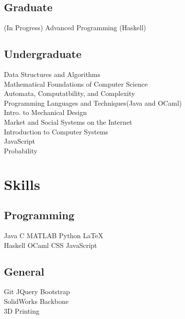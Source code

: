 \documentclass[]{deedy-resume-openfont}
\begin{document}
\begin{minipage}[t]{0.33\textwidth}
\subsection{Graduate}
\textbullet{}(In Progress) Advanced Programming (Haskell)
\sectionsep
\subsection{Undergraduate}
\sectionsep
{}
\textbullet{}Data Structures and Algorithms\\
\textbullet{}Mathematical Foundations of Computer Science\\
\textbullet{}Automata, Computatbility, and Complexity\\
\textbullet{}Programming Languages and Techniques(Java and OCaml)\\
\textbullet{}Intro. to Mechanical Design \\
\textbullet{}Market and Social Systems on the Internet\\
\sectionsep
{}
\textbullet{}Introduction to Computer Systems\\
\textbullet{}JavaScript\\
\textbullet{}Probability\\

\sectionsep


\section{Skills}
\subsection{Programming}
Java \textbullet{}   C \textbullet{}  MATLAB \textbullet{} Python
\textbullet{}  \LaTeX\ \\
Haskell \textbullet{} OCaml \textbullet{} CSS \textbullet{} JavaScript \\
\sectionsep
\subsection{General}
Git \textbullet{} JQuery \textbullet{} Bootstrap  \\
SolidWorks \textbullet{} Backbone \\
3D Printing

\sectionsep

%
%

\end{minipage}
\end{document}
